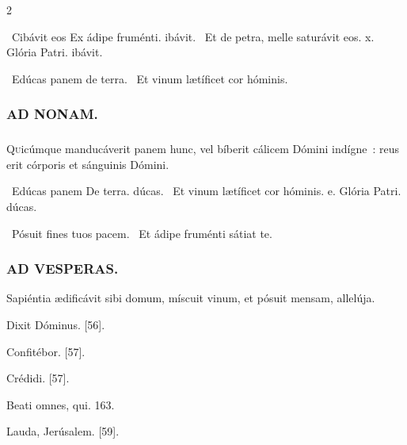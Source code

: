 \documentclass[9pt,twoside]{extarticle}
\begin{document}
\begin{multicols}{2}
\begin{tightlist}{}
\item {}~Cibávit eos \textred{*} Ex ádipe fruménti. ibávit. ~Et de petra, melle saturávit eos. x. Glória Patri. ibávit.
\item {}~Edúcas panem de terra. ~Et vinum lætíficet cor hóminis.
\end{tightlist}

\subsubsection*{\center \textsc{AD NONAM.}}
\subsubsection*{}
\lettrine{Q}uicúmque manducáverit panem hunc, vel bíberit cálicem Dómini indígne~: reus erit córporis et sánguinis Dómini.

\begin{tightlist}{}
\item {}~Edúcas panem \textred{*} De terra. dúcas. ~Et vinum lætíficet cor hóminis. e. Glória Patri. dúcas.
\item {}~Pósuit fines tuos pacem. ~Et ádipe fruménti sátiat te.
\end{tightlist}

\subsubsection*{\center \textsc{AD VESPERAS.}}
\begin{tightlist}{}
\item {} Sapiéntia ædificávit sibi domum, míscuit vinum, et pósuit mensam, allelúja.
\item {} Dixit Dóminus. [56]. 
\item {} Confitébor. [57]. 
\item {} Crédidi. [57]. 
\item {} Beati omnes, qui. 163. 
\item {} Lauda, Jerúsalem. [59].
\end{tightlist}


\end{multicols}
\end{document}
